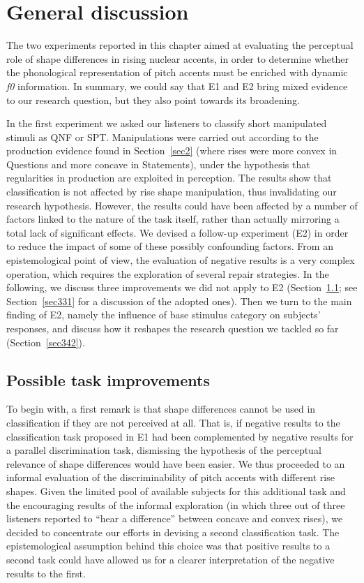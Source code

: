 \section{General discussion}\label{sec34}
The two experiments reported in this chapter aimed at evaluating the perceptual role of shape differences in rising nuclear accents, in order to determine whether the phonological representation of pitch accents must be enriched with dynamic \textit{f0} information. In summary, we could say that E1 and E2 bring mixed evidence to our research question, but they also point towards its broadening. 

In the first experiment we asked our listeners to classify short manipulated stimuli as QNF or SPT. Manipulations were carried out according to the production evidence found in Section~\ref{sec2} (where rises were more convex in Questions and more concave in Statements), under the hypothesis that regularities in production are exploited in perception. The results show that classification is not affected by rise shape manipulation, thus invalidating our research hypothesis. However, the results could have been affected by a number of factors linked to the nature of the task itself, rather than actually mirroring a total lack of significant effects. We devised a follow-up experiment (E2) in order to reduce the impact of some of these possibly confounding factors. From an epistemological point of view, the evaluation of negative results is a very complex operation, which requires the exploration of several repair strategies. In the following, we discuss three improvements we did not apply to E2 (Section~\ref{sec341}; see Section~\ref{sec331} for a discussion of the adopted ones). Then we turn to the main finding of E2, namely the influence of base stimulus category on subjects' responses, and discuss how it reshapes the research question we tackled so far (Section~\ref{sec342}).

\subsection{Possible task improvements}\label{sec341}
To begin with, a first remark is that shape differences cannot be used in classification if they are not perceived at all. That is, if negative results to the classification task proposed in E1 had been complemented by negative results for a parallel discrimination task, dismissing the hypothesis of the perceptual relevance of shape differences would have been easier. We thus proceeded to an informal evaluation of the discriminability of pitch accents with different rise shapes. Given the limited pool of available subjects for this additional task and the encouraging results of the informal exploration (in which three out of three listeners reported to ``hear a difference'' between concave and convex rises), we decided to concentrate our efforts in devising a second classification task. The epistemological assumption behind this choice was that positive results to a second task could have allowed us for a clearer interpretation of the negative results to the first.

